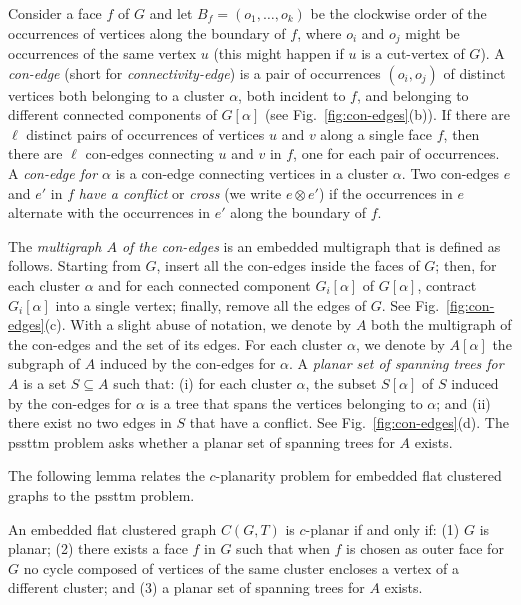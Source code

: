 \documentclass[letter,runningheads]{llncs}
\newcommand{\conf}{\otimes}
\begin{document}
Consider a face $f$ of $G$ and let $B_f=(o_1,\dots,o_k)$ be the clockwise order of the occurrences of vertices along the boundary of $f$, where $o_i$ and $o_j$ might be occurrences of the same vertex $u$ (this might happen if $u$ is a cut-vertex of $G$). A {\em con-edge} (short for {\em connectivity-edge}) is a pair of occurrences $(o_i,o_j)$ of distinct vertices both belonging to a cluster $\alpha$, both incident to $f$, and belonging to different connected components of $G[\alpha]$ (see Fig.~\ref{fig:con-edges}(b)). If there are $\ell$ distinct pairs of occurrences of vertices $u$ and $v$ along a single face $f$, then there are $\ell$ con-edges connecting $u$ and $v$ in $f$, one for each pair of occurrences. A {\em con-edge for $\alpha$} is a con-edge connecting vertices in a cluster $\alpha$. Two con-edges $e$ and $e'$ in $f$ {\em have a conflict} or {\em cross} (we write $e \conf e'$) if the occurrences in $e$ alternate with the occurrences in $e'$ along the boundary of $f$.

The {\em multigraph $A$ of the con-edges} is an embedded multigraph that is defined as follows. Starting from $G$, insert all the con-edges inside the faces of $G$; then, for each cluster $\alpha$ and for each connected component $G_i[\alpha]$ of $G[\alpha]$, contract $G_i[\alpha]$ into a single vertex; finally, remove all the edges of $G$.  See Fig.~\ref{fig:con-edges}(c). With a slight abuse of notation, we denote by $A$ both the multigraph of the con-edges and the set of its edges. For each cluster $\alpha$, we denote by $A[\alpha]$ the subgraph of $A$ induced by the con-edges for $\alpha$. A {\em planar set of spanning trees for $A$} is a set $S\subseteq A$ such that: (i) for each cluster $\alpha$, the subset $S[\alpha]$ of $S$ induced by the con-edges for $\alpha$ is a tree that spans the vertices belonging to $\alpha$; and (ii) there exist no two edges in $S$ that have a conflict. See Fig.~\ref{fig:con-edges}(d). The {\sc pssttm} problem asks whether a planar set of spanning trees for $A$ exists.

The following lemma relates the $c$-planarity problem for embedded flat clustered graphs to the {\sc pssttm} problem.

\begin{lemma} \label{le:acyclic-saturator}
An embedded flat clustered graph $C(G,T)$ is $c$-planar if and only if: (1) $G$ is planar; (2) there exists a face $f$ in $G$ such that when $f$ is chosen as outer face for $G$ no cycle composed of vertices of the same cluster encloses a vertex of a different cluster; and (3) a planar set of spanning trees for $A$ exists.
\end{lemma}
\end{document}
